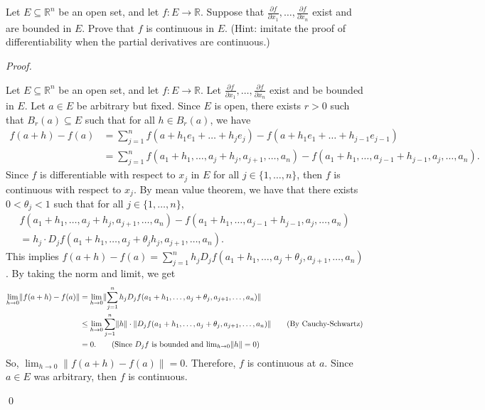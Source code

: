 \documentclass[12pt]{article}
\newenvironment{problem}[2][Problem]{\begin{trivlist}
\item[\hskip \labelsep {\bfseries #1}\hskip \labelsep {\bfseries
#2.}]}{\end{trivlist}}
\newenvironment{sol}
    {\emph{Proof.}
    }
    {
    \qed
    }
\begin{document}
  
  
  
  \begin{problem}{10}
  Let $E \subseteq \mathbb{R}^n$ be an open set, and let $f : E \to \mathbb{R}$. Suppose that $\frac{\partial f}{\partial x_1}, \dots, \frac{\partial f}{\partial x_n}$ exist and are bounded in $E$. Prove that $f$ is continuous in $E$. (Hint: imitate the proof of differentiability when the partial derivatives are continuous.)
  \end{problem}
  \begin{sol}
  Let $E \subseteq \mathbb{R}^n$ be an open set, and let $f : E \to \mathbb{R}$. Let $\frac{\partial f}{\partial x_1}, \dots, \frac{\partial f}{\partial x_n}$ exist and be bounded in $E$. Let $a \in E$ be arbitrary but fixed. Since $E$ is open, there exists $r > 0$ such that $B_r(a) \subseteq E$ such that for all $h \in B_r(a)$, we have \begin{align*}
      f(a+h) - f(a) &= \sum_{j = 1}^nf(a+h_1e_1 + \dots + h_je_j) - f(a + h_1e_1 + \dots + h_{j-1}e_{j-1}) \\ &= \sum_{j = 1}^nf(a_1 + h_1, \dots , a_j + h_j, a_{j+1}, \dots , a_n) - f(a_1 + h_1, \dots , a_{j-1} + h_{j-1} , a_j , \dots , a_n).
  \end{align*}
  Since $f$ is differentiable with respect to $x_j$ in $E$ for all $j \in \{1, \dots , n\}$, then $f$ is continuous with respect to $x_j$. By mean value theorem, we have that there exists $0 < \theta_j < 1$ such that for all $j \in \{1, \dots , n\}$, \begin{align*}
      f(a_1 + h_1, \dots , a_j + h_j , a_{j + 1} , \dots , a_n) - f(a_1 + h_1, \dots , a_{j-1} + h_{j-1}, a_j , \dots , a_n) \\ = h_j\cdot D_jf(a_1 + h_1, \dots , a_j + \theta_jh_j , a_{j+1}, \dots , a_n).
      \end{align*}
      This implies $f(a+h) - f(a) = \sum_{j = 1}^nh_jD_jf(a_1 + h_1, \dots , a_j + \theta_j, a_{j+1}, \dots , a_n)$. By taking the norm and limit, we get \begin{align*}
          \lim_{h \to 0} \lVert f(a+h) - f(a) \rVert &= \lim_{h \to 0} \lVert \sum_{j = 1}^nh_jD_jf(a_1 + h_1, \dots , a_j + \theta_j, a_{j+1}, \dots , a_n) \rVert \\ &\leq \lim_{h \to 0} \sum_{j = 1}^n \lVert h \rVert \cdot \lVert D_jf(a_1 + h_1, \dots , a_j + \theta_j, a_{j+1}, \dots , a_n) \rVert \tag*{(By Cauchy-Schwartz)} \\ &= 0. \tag*{(Since $D_jf$ is bounded and $\lim_{h \to 0}\lVert h \rVert = 0$)}
      \end{align*}
      So, $\lim_{h \to 0} \lVert f(a+h) - f(a) \rVert = 0$. Therefore, $f$ is continuous at $a$. Since $a \in E$ was arbitrary, then $f$ is continuous.
  \end{sol}
  
\end{document}

